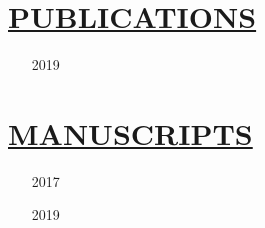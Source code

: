 \documentclass[11pt]{article}
\begin{document}
\section*{\centering\underline{PUBLICATIONS}}
\begin{itemize}
    \item[2019] 
\end{itemize}
\section*{\centering\underline{MANUSCRIPTS}}
\begin{itemize}
    \item[2017] 
    \item[2019] 
\end{itemize}
\end{document}
